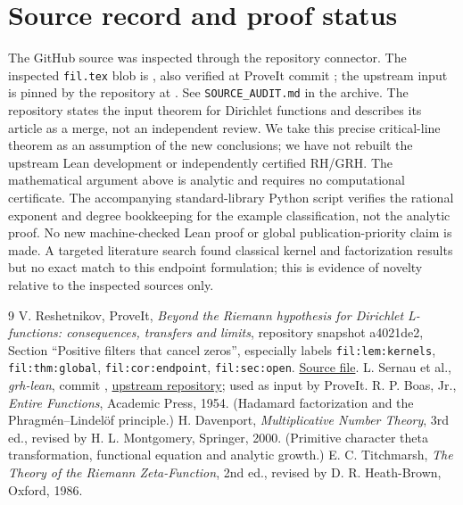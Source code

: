 \documentclass[11pt]{article}
\theoremstyle{remark}\newtheorem{remark}[theorem]{Remark}
\begin{document}
\section*{Source record and proof status}
\begingroup\sloppy
The GitHub source was inspected through the repository connector. The inspected \texttt{fil.tex} blob is , also verified at ProveIt commit ; the upstream input is pinned by the repository at . See \texttt{SOURCE\_AUDIT.md} in the archive. The repository states the input theorem for Dirichlet functions and describes its article as a merge, not an independent review. We take this precise critical-line theorem as an assumption of the new conclusions; we have not rebuilt the upstream Lean development or independently certified RH/GRH. The mathematical argument above is analytic and requires no computational certificate. The accompanying standard-library Python script verifies the rational exponent and degree bookkeeping for the example classification, not the analytic proof. No new machine-checked Lean proof or global publication-priority claim is made. A targeted literature search found classical kernel and factorization results but no exact match to this endpoint formulation; this is evidence of novelty relative to the inspected sources only.

\endgroup
\begin{thebibliography}{9}
 V. Reshetnikov, ProveIt, \emph{Beyond the Riemann hypothesis for Dirichlet L-functions: consequences, transfers and limits}, repository snapshot a4021de2, Section ``Positive filters that cancel zeros'', especially labels \texttt{fil:lem:kernels}, \texttt{fil:thm:global}, \texttt{fil:cor:endpoint}, \texttt{fil:sec:open}. \href{https://github.com/VladimirReshetnikov/ProveIt/blob/a4021de208d592a04419593436847c8e9db9b456/Analysis/GeneralizedRiemannHypothesis/Article/sections/fil.tex}{Source file}.
 L. Sernau et al., \emph{grh-lean}, commit , \href{https://github.com/lsernau/grh-lean/tree/72fead102f663d5c7a407964a13dc0cf9d977207}{upstream repository}; used as input by ProveIt.
 R. P. Boas, Jr., \emph{Entire Functions}, Academic Press, 1954. (Hadamard factorization and the Phragm\'en--Lindel\"of principle.)
 H. Davenport, \emph{Multiplicative Number Theory}, 3rd ed., revised by H. L. Montgomery, Springer, 2000. (Primitive character theta transformation, functional equation and analytic growth.)
 E. C. Titchmarsh, \emph{The Theory of the Riemann Zeta-Function}, 2nd ed., revised by D. R. Heath-Brown, Oxford, 1986.
\end{thebibliography}
\end{document}

